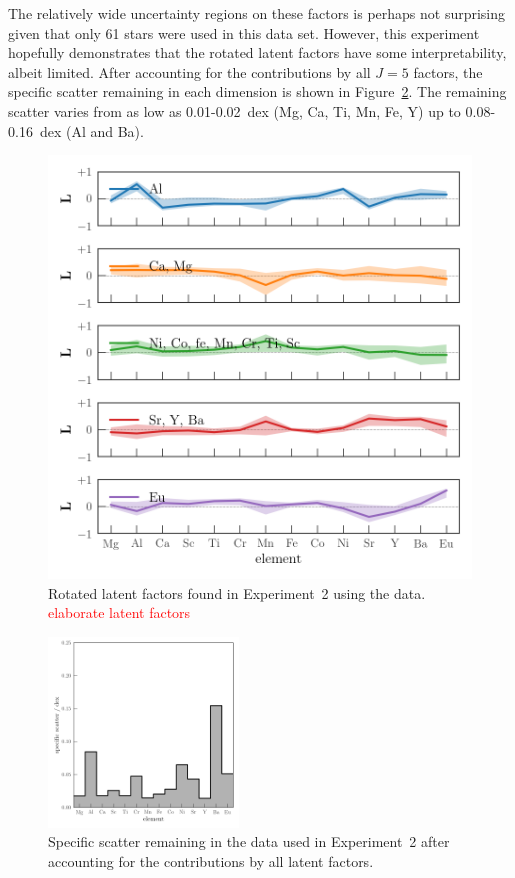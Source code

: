 \documentclass[twocolumn]{aastex61}
\newcommand{\todo}[1]{\textcolor{red}{#1}}
\begin{document}
The relatively wide uncertainty regions on these factors is perhaps not
surprising given that only 61 stars were used in this data set. However, this
experiment hopefully demonstrates that the rotated latent factors have some
interpretability, albeit limited. After accounting for the contributions by all
$J = 5$ factors, the specific scatter remaining in each dimension is shown in
Figure~\ref{fig:exp2-specific-scatter}. The remaining scatter varies from as low 
as 0.01-0.02~dex (Mg, Ca, Ti, Mn, Fe, Y) up to 0.08-0.16~dex (Al and Ba). 


\begin{figure}
	\includegraphics[width=\textwidth]{experiments/exp2-latent-factors.png}
	\caption{Rotated latent factors found in Experiment~2 using the \citet{Barklem:2003}
			 data. \todo{elaborate latent factors}}
    \label{fig:exp2-latent-factors}
\end{figure}



\begin{figure}
	\includegraphics[width=0.45\textwidth]{experiments/exp2-specific-scatter.png}
	\caption{Specific scatter remaining in the \citet{Barklem:2003} data used in
			 Experiment~2 after accounting for the contributions by all latent
			 factors.}
    \label{fig:exp2-specific-scatter}
\end{figure}
\end{document}
